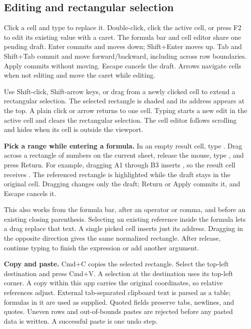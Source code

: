 \documentclass[11pt,letterpaper]{article}
\newcommand{\code}[1]{\texttt{\detokenize{#1}}}
\begin{document}
\subsection{Editing and rectangular selection}
Click a cell and type to replace it. Double-click, click the active cell, or press
F2 to edit its existing value with a caret. The formula bar and cell editor share
one pending draft. Enter commits and moves down; Shift+Enter moves up. Tab and
Shift+Tab commit and move forward/backward, including across row boundaries.
Apply commits without moving. Escape cancels the draft. Arrows navigate cells
when not editing and move the caret while editing.

Use Shift-click, Shift-arrow keys, or drag from a newly clicked cell to extend a
rectangular selection. The selected rectangle is shaded and its address appears
at the top. A plain click or arrow returns to one cell. Typing starts a new edit
in the active cell and clears the rectangular selection. The cell editor follows
scrolling and hides when its cell is outside the viewport.

\textbf{Pick a range while entering a formula.} In an empty result cell, type
\code{=sum(}. Drag across a rectangle of numbers on the current sheet, release
the mouse, type \code{)}, and press Return. For example, dragging A1 through B3
inserts \code{A1:B3}, so the result cell receives \code{=sum(A1:B3)}. The referenced
rectangle is highlighted while the draft stays in the original cell. Dragging
changes only the draft; Return or Apply commits it, and Escape cancels it.

This also works from the formula bar, after an operator or comma, and before an
existing closing parenthesis. Selecting an existing reference inside the formula
lets a drag replace that text. A single picked cell inserts just its address.
Dragging in the opposite direction gives the same normalized rectangle. After
release, continue typing to finish the expression or add another argument.

\textbf{Copy and paste.} Cmd+C copies the selected rectangle. Select the top-left
destination and press Cmd+V. A selection at the destination uses its top-left
corner. A copy within this app carries the original coordinates, so relative
references adjust. External tab-separated clipboard text is parsed as a table;
formulas in it are used as supplied. Quoted fields preserve tabs, newlines, and
quotes. Uneven rows and out-of-bounds pastes are rejected before any pasted data
is written. A successful paste is one undo step.
\end{document}
